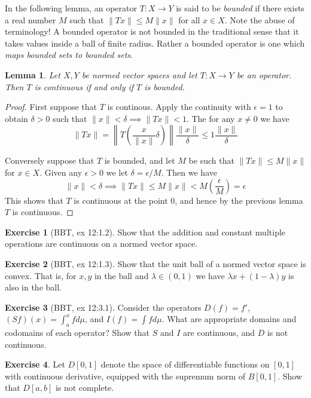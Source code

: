 \documentclass[11pt,oneside]{amsbook}
\theoremstyle{definition}
\newtheorem{exerc}{Exercise}[section]
\theoremstyle{plain}
\newtheorem{lem}[thm]{Lemma}
\theoremstyle{definition}
\theoremstyle{remark}
\numberwithin{equation}{section}
\numberwithin{figure}{section}
\begin{document}
In the following lemma, an operator $T\colon X\to Y$ is said to be \emph{bounded} if there exists a real number $M$ such that $\|Tx\|\leq M\|x\|$ for all $x\in X$. Note the abuse of terminology! A bounded operator is not bounded in the traditional sense that it takes values inside a ball of finite radius. Rather a bounded operator is one which \emph{maps bounded sets to bounded sets}.

\begin{lem}
  Let $X,Y$ be normed vector spaces and let $T\colon X\to Y$ be an operator. Then $T$ is continuous if and only if $T$ is bounded.
\end{lem}

\begin{proof}
  First suppose that $T$ is continous. Apply the continuity with $\epsilon=1$ to obtain $\delta>0$ such that $\|x\|<\delta\implies\|Tx\|<1$. The for any $x\neq0$ we have
  \[\|Tx\|=\left\|T\left(\frac{x}{\|x\|}\delta\right)\right\|\frac{\|x\|}{\delta}\leq 1\frac{\|x\|}{\delta}
  \]

  Conversely suppose that $T$ is bounded, and let $M$ be such that $\|Tx\|\leq M\|x\|$ for $x\in X$. Given any $\epsilon>0$ we let $\delta=\epsilon/M$. Then we have
  \[\|x\|<\delta\implies\|Tx\|\leq M\|x\|<M\left(\frac{\epsilon}{M}\right)=\epsilon
  \]
  This shows that $T$ is continuous at the point $0$, and hence by the previous lemma $T$ is continuous.
\end{proof}

\begin{exerc}[BBT, ex 12:1.2]
  Show that the addition and constant multiple operations are continuous on a normed vector space.
\end{exerc}

\begin{exerc}[BBT, ex 12:1.3]
  Show that the unit ball of a normed vector space is convex. That is, for $x,y$ in the ball and $\lambda\in(0,1)$ we have $\lambda x+(1-\lambda)y$ is also in the ball.
\end{exerc}

\begin{exerc}[BBT, ex 12:3.1]
  Consider the operators $D(f)=f'$, $(Sf)(x)=\int_a^x fd\mu$, and $I(f)=\int fd\mu$. What are appropriate domains and codomains of each operator? Show that $S$ and $I$ are continuous, and $D$ is not continuous.
\end{exerc}

\begin{exerc}
  Let $D[0,1]$ denote the space of differentiable functions on $[0,1]$ with continuous derivative, equipped with the supremum norm of $B[0,1]$. Show that $D[a,b]$ is not complete.
\end{exerc}
\end{document}
